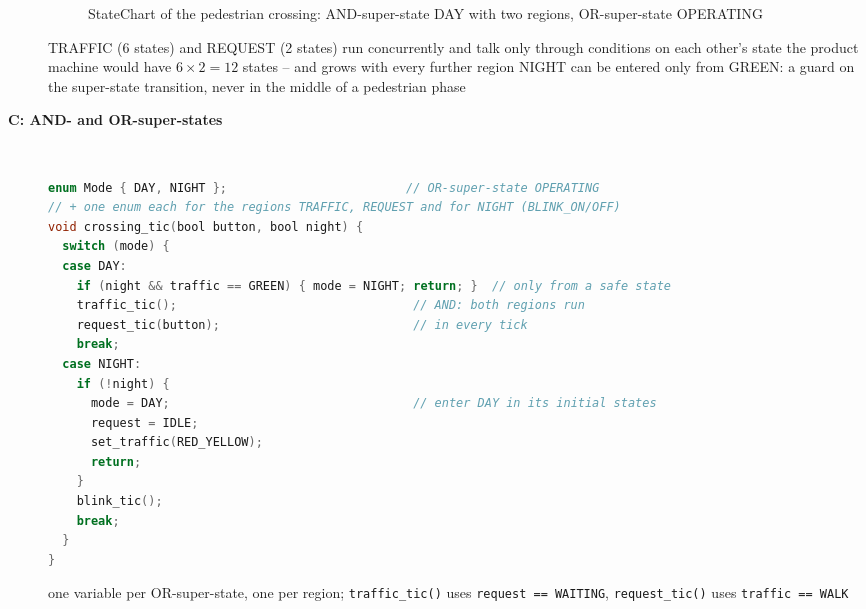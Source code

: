 \begin{description}
\begin{figure}[!hbtp]
\begin{center}
\begin{adjustbox}{max width=0.95\textwidth, max height=0.4\textheight}
\end{adjustbox}
\caption{StateChart of the pedestrian crossing: AND-super-state DAY with two regions, OR-super-state OPERATING}
\end{center}
\end{figure}
\bi
	\ite TRAFFIC (6 states) and REQUEST (2 states) run concurrently and talk only through conditions on each other's state
	\ite the product machine would have $6 \times 2 = 12$ states -- and grows with every further region
	\ite NIGHT can be entered only from GREEN: a guard on the super-state transition, never in the middle of a pedestrian phase
\ei
\os{\newpage}

\item[{\rot\bf C: AND- and OR-super-states}]~\\[-\lstskip]
\begin{lstlisting}[language=C]
enum Mode { DAY, NIGHT };                         // OR-super-state OPERATING
// + one enum each for the regions TRAFFIC, REQUEST and for NIGHT (BLINK_ON/OFF)
void crossing_tic(bool button, bool night) {
  switch (mode) {
  case DAY:
    if (night && traffic == GREEN) { mode = NIGHT; return; }  // only from a safe state
    traffic_tic();                                 // AND: both regions run
    request_tic(button);                           // in every tick
    break;
  case NIGHT:
    if (!night) {
      mode = DAY;                                  // enter DAY in its initial states
      request = IDLE;
      set_traffic(RED_YELLOW);
      return;
    }
    blink_tic();
    break;
  }
}
\end{lstlisting}
\bi
	\ite one variable per OR-super-state, one per region; \texttt{traffic\_tic()} uses \texttt{request == WAITING}, \texttt{request\_tic()} uses \texttt{traffic == WALK}
\ei
\os{\newpage}


\end{description}
